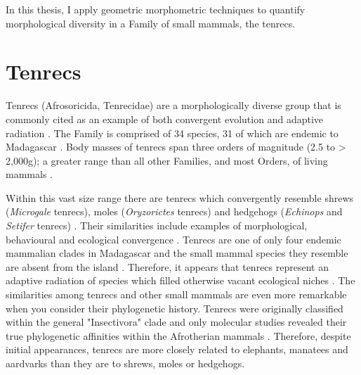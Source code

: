 	In this thesis, I apply geometric morphometric techniques to quantify morphological diversity in a Family of small mammals, the tenrecs.

\section{Tenrecs} %
	Tenrecs (Afrosoricida, Tenrecidae) are a morphologically diverse group that is commonly cited as an example of both convergent evolution and adaptive radiation \citep{Soarimalala2011, Eisenberg1969}. 
	The Family is comprised of 34 species, 31 of which are endemic to Madagascar \citep{Olson2013}. Body masses of tenrecs span three orders of magnitude (2.5 to > 2,000g); a greater range than all other Families, and most Orders, of living mammals \citep{Olson2003}.
	
	Within this vast size range there are tenrecs which convergently resemble shrews (\textit{Microgale} tenrecs), moles (\textit{Oryzorictes} tenrecs) and hedgehogs (\textit{Echinops} and \textit{Setifer} tenrecs) %
	 \citep{Eisenberg1969}. Their similarities include examples of morphological, behavioural and ecological convergence \citep{Soarimalala2011}. Tenrecs are one of only four endemic mammalian clades in Madagascar and the small mammal species they resemble are absent from the island \citep{Garbutt1999}. Therefore, it appears that tenrecs represent an adaptive radiation of species which filled otherwise vacant ecological niches \citep{Soarimalala2011}.
	The similarities among tenrecs and other small mammals are even more remarkable when you consider their phylogenetic history. Tenrecs were originally classified within the general "Insectivora" clade and only molecular studies revealed their true phylogenetic affinities within the Afrotherian mammals \citep{Stanhope1998}. Therefore, despite initial appearances, tenrecs are more closely related to elephants, manatees and aardvarks than they are to shrews, moles or hedgehogs. 
	

